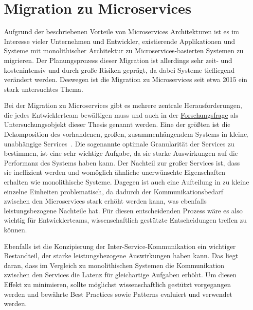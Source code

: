 \section{Migration zu Microservices}

Aufgrund der beschriebenen Vorteile von Microservices Architekturen ist es im Interesse vieler Unternehmen und Entwickler, existierende Applikationen und Systeme mit monolithischer Architektur zu Microservices-basierten Systemen zu migrieren.
Der Planungsprozess dieser Migration ist allerdings sehr zeit- und kostenintensiv und durch große Risiken geprägt, da dabei Systeme tiefliegend verändert werden.
Deswegen ist die Migration zu Microservices seit etwa 2015 ein stark untersuchtes Thema.

Bei der Migration zu Microservices gibt es mehrere zentrale Herausforderungen, die jedes Entwicklerteam bewältigen muss und auch in der \hyperref[forschungsfrage:1]{Forschungsfrage} als Untersuchungsobjekt dieser Thesis genannt werden.
Eine der größten ist die Dekomposition des vorhandenen, großen, zusammenhängendem Systems in kleine, unabhängige Services~\cite{a-survey-on,taibi2017processmotivations,taibi2019decomposition}.
Die sogenannte optimale Granularität der Services zu bestimmen, ist eine sehr wichtige Aufgabe, da sie starke Auswirkungen auf die Performanz des Systems haben kann.
Der Nachteil zur großer Services ist, dass sie ineffizient werden und womöglich ähnliche unerwünschte Eigenschaften erhalten wie monolithische Systeme.
Dagegen ist auch eine Aufteilung in zu kleine einzelne Einheiten problematisch, da dadurch der Kommunikationsbedarf zwischen den Microservices stark erhöht werden kann, was ebenfalls leistungsbezogene Nachteile hat.
Für diesen entscheidenden Prozess wäre es also wichtig für Entwicklerteams, wissenschaftlich gestützte Entscheidungen treffen zu können.

Ebenfalls ist die Konzipierung der Inter-Service-Kommunikation ein wichtiger Bestandteil, der starke leistungsbezogene Auswirkungen haben kann.
Das liegt daran, dass im Vergleich zu monolithischen Systemen die Kommunikation zwischen den Services die Latenz für gleichartige Aufgaben erhöht.
Um diesen Effekt zu minimieren, sollte möglichst wissenschaftlich gestützt vorgegangen werden und bewährte Best Practices sowie Patterns evaluiert und verwendet werden.

